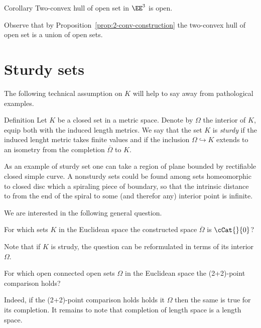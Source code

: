 \begin{thm}{Corollary}
Two-convex hull of open set in $\EE^3$ is open.
\end{thm}

Observe that by Proposition~\ref{prop:2-conv-construction}
the two-convex hull of open set is a union of open sets.
\qeds







\section{Sturdy sets}

The following technical assumption on $K$ will help to say away from pathological examples.

\begin{thm}{Definition}
Let $K$ be a closed set in a metric space.
Denote by $\Omega$ the interior of $K$, equip both with the induced length metrics.
We say that the set $K$ is \emph{sturdy} if the induced lenght metric takes finite values and 
if the inclusion $\Omega\hookrightarrow K$ extends to an isometry
from the completion $\overline \Omega$ to $K$.
\end{thm}

As an example of sturdy set one can take a region of plane bounded by rectifiable closed simple curve.
A nonsturdy sets could be found among sets homeomorphic to closed disc 
which a spiraling piece of boundary, so that the intrinsic distance to from the end of the spiral to some (and therefor any) interior point is infinite. 

We are interested in the following general question.

\begin{clm}{}
For which sets $K$ in the Euclidean space 
the constructed space $\overline\Omega$ is $\cCat{}{0}$? 
\end{clm}

Note that if $K$ is strudy, the question can be reformulated in terms of its interior $\Omega$.

\begin{clm}{}
For which open connected open sets $\Omega$ in the Euclidean space 
the (2+2)-point comparison holds?
\end{clm}

Indeed, if the (2+2)-point comparison holds holds it $\Omega$ then the same is true for its completion. 
It remains to note that completion of length space is a length space.

